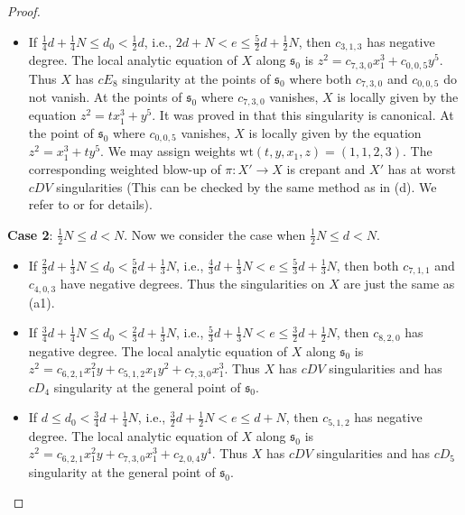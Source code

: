 \documentclass[a4paper,11pt]{amsart}
\newcommand{\s}{\ensuremath{\mathfrak{s}}}
\theoremstyle{definition}
\theoremstyle{remark}
\numberwithin{equation}{section}
\begin{document}
\begin{proof}
\begin{itemize}
		\item[(e1)] If $\frac14d + \frac14 N \le d_0 < \frac12d$, i.e., $2d + N < e \le \frac52d + \frac12N$, then $c_{3,1,3}$ has negative degree. The local analytic equation of $X$ along $\s_0$ is $z^2=c_{7,3,0}x_1^3 + c_{0,0,5}y^5$. Thus $X$  has $cE_8$ singularity at the points of $\s_0$ where both $c_{7,3,0}$ and $c_{0,0,5}$ do not vanish. At the points of $\s_0$ where $c_{7,3,0}$ vanishes, $X$ is locally given by the equation $z^2 = tx_1^3 + y^5$. It was proved in \cite[Lemma 1.14]{CP} that this singularity is canonical. At the point of $\s_0$ where $c_{0,0,5}$ vanishes, $X$ is locally given by the equation $z^2 = x_1^3 + ty^5$. We may assign weights $\mathrm{wt}(t,y,x_1,z)=(1,1,2,3)$. The corresponding weighted blow-up of $\pi: X' \to X$ is crepant and $X'$ has at worst $cDV$ singularities (This can be checked by the same method as in (d). We refer to \cite[Theorem (2.11) and Corollary (2.12)]{C3f} or \cite[\S 5.6]{KM} for details).     
	\end{itemize}
    
	\textbf{Case 2}: $\frac{1}{2}N\leq d<N$. Now we consider the case when $\frac{1}{2}N\leq d<N$. %
	\begin{itemize}
		\item[(a2)] If $\frac23d + \frac13 N \le d_0 < \frac56d + \frac13 N$, i.e., $\frac43d + \frac13N < e \le \frac53d + \frac13N$, then both $c_{7,1,1}$ and $c_{4,0,3}$ have negative degrees. Thus the singularities on $X$ are just the same as (a1).
        
		
		\item[(b2)] If $\frac34d + \frac14 N \le d_0 <\frac23d + \frac13 N $, i.e., $\frac53d + \frac13N < e \le\frac32d + \frac12N $, then $c_{8,2,0}$ has negative degree. The local analytic equation of $X$ along $\s_0$ is $z^2= c_{6,2,1}x_1^2y + c_{5,1,2}x_1y^2 + c_{7,3,0}x_1^3$. Thus $X$ has $cDV$ singularities and has $cD_4$ singularity at the general point of $\s_0$.
        
		\item[(c2)] If $d \le d_0 < \frac34d + \frac14 N$, i.e., $\frac32d + \frac12N < e \le d + N$, then $c_{5,1,2}$ has negative degree. The local analytic equation of $X$ along $\s_0$ is $z^2 = c_{6,2,1}x_1^2y + c_{7,3,0}x_1^3 + c_{2,0,4}y^4$. Thus $X$ has $cDV$ singularities and has $cD_5$ singularity at the general point of $\s_0$.
        

\end{itemize}
\end{proof}
\end{document}
